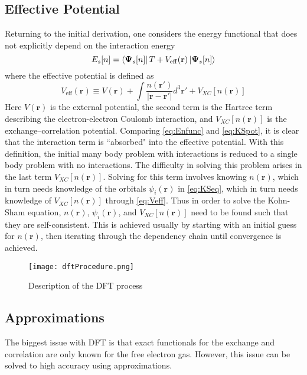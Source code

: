 \documentclass[12pt]{article}
\begin{document}
\subsection{Effective Potential} %
Returning to the initial derivation, one considers the energy functional that does not explicitly depend on the interaction energy 
\begin{equation}\label{eq:KSpot}
    E_s[n] = \bra{\boldsymbol{\Psi}_s[n]}T+V_{\mathrm{eff}}(\textbf{r})\ket{\boldsymbol{\Psi}_s[n]} 
\end{equation}
where the effective potential is defined as 
\begin{equation}\label{eq:Veff}
    V_{\mathrm{eff}}(\textbf{r}) \equiv V(\textbf{r}) + \int \frac{n(\textbf{r}')}{|\textbf{r}-\textbf{r}'|}d^3\textbf{r}' + V_{XC}[n(\textbf{r})]
\end{equation}
Here $V(\textbf{r})$ is the external potential, the second term is the Hartree term describing the electron-electron Coulomb interaction, and $V_{XC}[n(\textbf{r})]$ is the exchange–correlation potential. Comparing \eqref{eq:Enfunc} and \eqref{eq:KSpot}, it is clear that the interaction term is ``absorbed" into the effective potential. With this definition, the initial many body problem with interactions is reduced to a single body problem with no interactions. The difficulty in solving this problem arises in the last term $V_{XC}[n(\textbf{r})]$. Solving for this term involves knowing $n(\textbf{r})$, which in turn needs knowledge of the orbitals $\psi_i(\textbf{r})$ in \eqref{eq:KSeq}, which in turn needs knowledge of $V_{XC}[n(\textbf{r})]$ through \eqref{eq:Veff}. Thus in order to solve the Kohn-Sham equation, $n(\textbf{r})$, $\psi_i(\textbf{r})$, and $V_{XC}[n(\textbf{r})]$ need to be found such that they are self-consistent. This is achieved usually by starting with an initial guess for $n(\textbf{r})$, then iterating through the dependency chain until convergence is achieved.

\begin{figure}
    \centering
    \texttt{[image: dftProcedure.png]}
    \caption{Description of the DFT process \cite{dftProcedure}}
    \label{fig:dftflowchart}
\end{figure}

\newpage
\subsection{Approximations} %
The biggest issue with DFT is that exact functionals for the exchange and correlation are only known for the free electron gas. However, this issue can be solved to high accuracy using approximations. 
\end{document}
